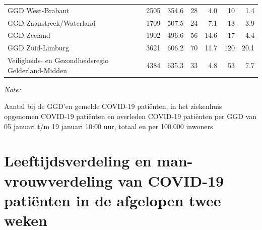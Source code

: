 \documentclass[
  english,
  man,floatsintext]{apa6}
\begin{document}
\begin{table}[H]
\begin{threeparttable}
\begin{tabular}{lrrrrrr}
GGD West-Brabant & 2505 & 354.6 & 28 & 4.0 & 10 & 1.4\\
GGD Zaanstreek/Waterland & 1709 & 507.5 & 24 & 7.1 & 13 & 3.9\\
GGD Zeeland & 1902 & 496.6 & 56 & 14.6 & 17 & 4.4\\
GGD Zuid-Limburg & 3621 & 606.2 & 70 & 11.7 & 120 & 20.1\\
Veiligheids- en Gezondheidsregio Gelderland-Midden & 4384 & 635.3 & 33 & 4.8 & 53 & 7.7\\
\bottomrule
\end{tabular}
\begin{tablenotes}
\item \textit{Note: } 
\item Aantal bij de GGD’en gemelde COVID-19 patiënten, in het ziekenhuis opgenomen COVID-19 patiënten en overleden COVID-19 patiënten per GGD van 05 januari t/m 19 januari 10:00 uur, totaal en per 100.000 inwoners
\end{tablenotes}
\end{threeparttable}
\endgroup{}
\end{table}

\newpage

\hypertarget{leeftijdsverdeling-en-man-vrouwverdeling-van-covid-19-patiuxebnten-in-de-afgelopen-twee-weken}{%
\section{Leeftijdsverdeling en man-vrouwverdeling van COVID-19 patiënten in de afgelopen twee weken}\label{leeftijdsverdeling-en-man-vrouwverdeling-van-covid-19-patiuxebnten-in-de-afgelopen-twee-weken}}
\end{document}
